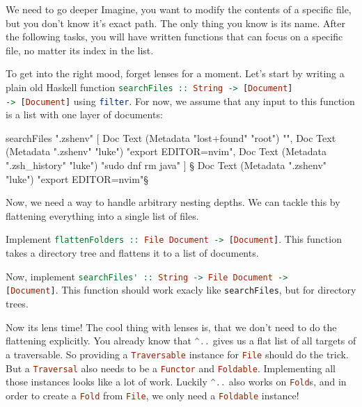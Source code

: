 \documentclass{exercise}
\makeatletter
\def\ergo{\smile@lst@style@comment\raisebox{.1pt}{\scalebox{.8}{\faCaretRight}}}
\newcommand\h[2][]{\lstinline[language=haskell,#1]{#2}}
\def\m#1{\tikzmark{#1}}
\makeatother
\begin{document}
\begin{exercise}{We need to go deeper}
		Imagine, you want to modify the contents of a specific file, but you don't know
		it's exact path. The only thing you know is its name. After the following tasks,
		you will have written functions that can focus on a specific file, no matter
		its index in the list.
		\begin{tasks}[resume*]
			\item To get into the right mood, forget lenses for a moment. Let's start by
				writing a plain old Haskell function \h{searchFiles :: String -> [Document]
				-> [Document]} using \h{filter}. For now, we assume that any input to
				this function is a list with one layer of documents:
				\begin{haskell}
searchFiles ".zshenv" [
  Doc Text (Metadata "lost+found" "root") "",
  Doc Text (Metadata ".zshenv" "luke") "export EDITOR=nvim",
  Doc Text (Metadata ".zsh_history" "luke") "sudo dnf rm java"
]
§\ergo{} Doc Text (Metadata ".zshenv" "luke") "export EDITOR=nvim"§
				\end{haskell}
		\end{tasks}
		Now, we need a way to handle arbitrary nesting depths. We can tackle this by
		flattening everything into a single list of files.
		\begin{tasks}[resume*]
			\item \m{op1}Implement \h{flattenFolders :: File Document -> [Document]}. This
				function takes a directory tree and flattens it to a list of documents.
			\item \m{op2}Now, implement \h{searchFiles' :: String -> File Document ->
				[Document]}. This function should work exacly like \h{searchFiles}, but
				for directory trees.
		\end{tasks}
		Now its lens time! The cool thing with lenses is, that we don't need to do the
		flattening explicitly. You already know that \h{^..} gives us a flat list of all
		targets of a traversable. So providing a \h{Traversable} instance for \h{File}
		should do the trick. But a \h{Traversal} also needs to be a \h{Functor} and
		\h{Foldable}. Implementing all those instances looks like a lot of work. Luckily
		\h{^..} also works on \h{Fold}s, and in order to create a \h{Fold} from
		\h{File}, we only need a \h{Foldable} instance!
		\begin{tasks}[resume*]

\end{tasks}
\end{exercise}
\end{document}
